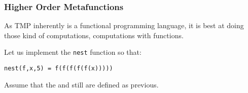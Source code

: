 \documentclass[11pt,a4paper,dvipsnames,usenames]{beamer}
\begin{document}
\begin{frame}[fragile]
  \frametitle{Higher Order Metafunctions}

  \vfill

  As TMP inherently is a functional programming language, it is best at doing those kind of computations, computations with
  functions.

  \vfill
  
  Let us implement the \texttt{nest} function so that:

  \vfill

  \hspace{1cm} \texttt{nest(f,x,5) = f(f(f(f(f(x)))))}

  \vfill

  Assume that the  and  still are defined as previous.

  \vfill

\end{frame}
\end{document}
